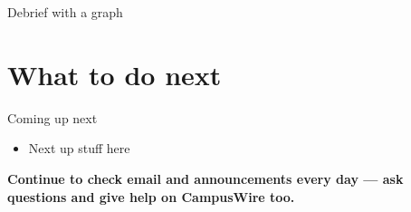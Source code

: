 \documentclass[10pt]{beamer}
\begin{document}
\begin{frame}{Debrief with a graph}
    
\end{frame}

\section[What to do next]{What to do next}
\begin{frame}{Coming up next}
    \begin{itemize}
    \item Next up stuff here 
\end{itemize}

\textbf{Continue to check email and announcements every day --- ask questions and give help on CampusWire too.}


\end{frame}
\end{document}
